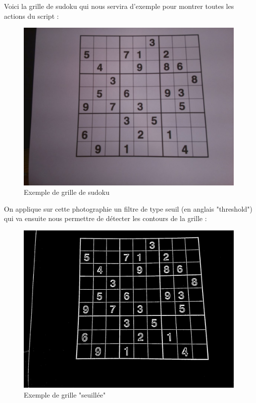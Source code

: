\documentclass[12pt,a4paper]{report}
\begin{document}
Voici la grille de sudoku qui nous servira d'exemple pour montrer toutes les actions du script :
\begin{figure}[!h]
 \center
 \includegraphics[scale=0.2]{../pictures/example.jpg}
 \caption{Exemple de grille de sudoku}
\end{figure}

On applique sur cette photographie un filtre de type seuil (en anglais "threshold") qui va ensuite nous permettre de détecter les contours de la grille :

\begin{figure}[!h]
 \center
 \includegraphics[scale=0.2]{../pictures/threshold.jpg}
 \caption{Exemple de grille "seuillée"}
 \end{figure}
 
\end{document}
